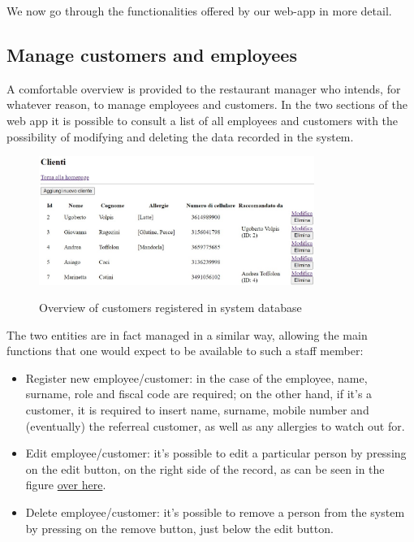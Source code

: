\documentclass{article}
\begin{document}
We now go through the functionalities offered by our web-app in more detail.

\subsection*{Manage customers and employees}
A comfortable overview is provided to the restaurant manager who intends, for whatever reason, to manage employees and customers. In the two sections of the web app it is possible to consult a list of all employees and customers with the possibility of modifying and deleting the data recorded in the system.

\begin{figure}[H]
    \centering
    \includegraphics[width=0.8\textwidth]{images/customers_overview.jpg}
    \label{fig:customers_overview}
    \caption{Overview of customers registered in system database}
\end{figure}

The two entities are in fact managed in a similar way, allowing the main functions that one would expect to be available to such a staff member:

\begin{itemize}
  \item Register new employee/customer: in the case of the employee, name, surname, role and fiscal code are required; on the other hand, if it's a customer, it is required to insert name, surname, mobile number and (eventually) the referreal customer, as well as any allergies to watch out for.
  \item Edit employee/customer: it's possible 
  to edit a particular person by pressing on the edit button, on the right side of the record, as can be seen in the figure \hyperref[fig:customers_overview]{over here}.
  \item Delete employee/customer: it's possible 
  to remove a person from the system by pressing on the remove button, just below the edit button.
\end{itemize}
\end{document}
